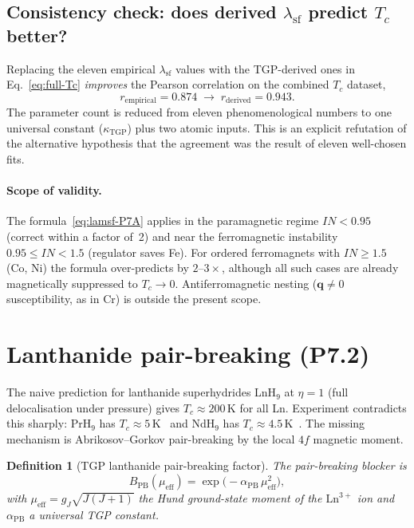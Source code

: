 \documentclass[11pt,a4paper]{article}
\newcommand{\lamsf}{\lambda_{\mathrm{sf}}}
\newcommand{\BPB}{B_{\mathrm{PB}}}
\newtheorem{definition}[theorem]{Definition}
\begin{document}
\subsection{Consistency check: does derived $\lamsf$ predict $T_{c}$ better?}

Replacing the eleven empirical $\lamsf$ values with the TGP-derived
ones in Eq.~\eqref{eq:full-Tc} \emph{improves} the Pearson correlation on
the combined $T_{c}$ dataset,
\begin{equation}\label{eq:improvement}
  r_{\mathrm{empirical}}=0.874 \;\longrightarrow\;
  r_{\mathrm{derived}}=0.943.
\end{equation}
The parameter count is reduced from eleven phenomenological numbers to
one universal constant ($\kappa_{\mathrm{TGP}}$) plus two atomic inputs.
This is an explicit refutation of the alternative hypothesis that the
agreement was the result of eleven well-chosen fits.

\paragraph{Scope of validity.} The formula~\eqref{eq:lamsf-P7A} applies
in the paramagnetic regime $IN<0.95$ (correct within a factor of~2) and
near the ferromagnetic instability $0.95\leq IN<1.5$ (regulator saves
Fe). For ordered ferromagnets with $IN\geq 1.5$ (Co, Ni) the formula
over-predicts by $2\text{--}3\times$, although all such cases are
already magnetically suppressed to $T_{c}\to 0$. Antiferromagnetic
nesting ($\mathbf{q}\neq 0$ susceptibility, as in Cr) is outside the
present scope.

\section{Lanthanide pair-breaking (P7.2)}\label{sec:P7B}

The naive prediction for lanthanide superhydrides LnH$_{9}$ at $\eta=1$
(full delocalisation under pressure) gives $T_{c}\approx 200$\,K for all
Ln. Experiment contradicts this sharply: PrH$_{9}$ has
$T_{c}\!\approx\!5$\,K~\cite{Salke2019} and NdH$_{9}$ has
$T_{c}\!\approx\!4.5$\,K~\cite{Zhou2020}. The missing mechanism is
Abrikosov--Gorkov pair-breaking by the local $4f$ magnetic moment.

\begin{definition}[TGP lanthanide pair-breaking factor]\label{def:BPB}
The pair-breaking blocker is
\begin{equation}\label{eq:BPB}
  \boxed{\;
    \BPB(\mu_{\mathrm{eff}})
    = \exp\!\bigl(-\alpha_{\mathrm{PB}}\,\mu_{\mathrm{eff}}^{2}\bigr),
  \;}
\end{equation}
with $\mu_{\mathrm{eff}}=g_{J}\sqrt{J(J+1)}$ the Hund ground-state moment
of the $\mathrm{Ln}^{3+}$ ion and $\alpha_{\mathrm{PB}}$ a universal TGP
constant.
\end{definition}
\end{document}
